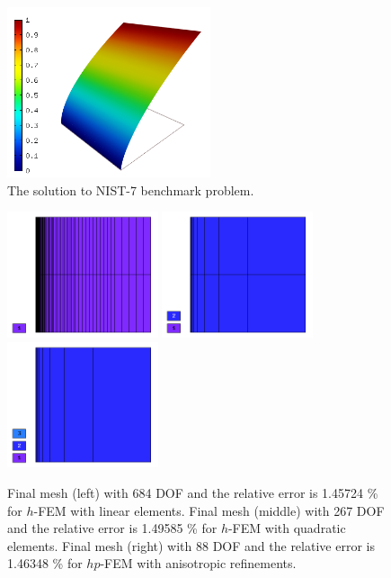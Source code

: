 \documentclass[12pt]{elsarticle}
\begin{document}
\begin{figure}[H]
\centering
\includegraphics[height=5cm]{nist/nist-7/solution.png}
\vspace{-3mm}
\caption{The solution to NIST-7 benchmark problem.}
\label{fig:sln-nist07}
\end{figure}

\begin{figure}[H]
\centering
\vspace{-5mm}
\includegraphics[height=3.7cm]{nist/nist-7/mesh_h1_aniso.png}
\includegraphics[height=3.7cm]{nist/nist-7/mesh_h2_aniso.png}
\includegraphics[height=3.7cm]{nist/nist-7/mesh_hp_aniso.png}
\vspace{-3mm}
\caption{
Final mesh (left) with 684 DOF and the relative error is 1.45724 \% for $h$-FEM with linear elements.
Final mesh (middle) with 267 DOF and the relative error is 1.49585 \% for $h$-FEM with quadratic elements.
Final mesh (right) with 88 DOF and the relative error is 1.46348 \% for $hp$-FEM with anisotropic refinements.}
\vspace{-3mm}
\label{fig:nist-7-hp-aniso}
\end{figure}
\end{document}
